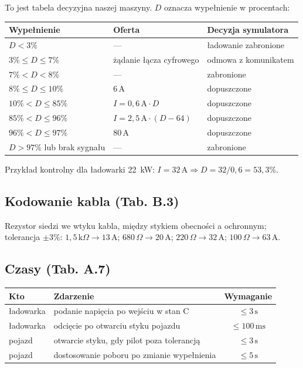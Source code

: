 \documentclass[a4paper,11pt]{article}
\newcommand{\ohm}{\,\Omega}
\newcommand{\kohm}{\,\mathrm{k}\Omega}
\newcommand{\amp}{\,\mathrm{A}}
\newcommand{\ms}{\,\mathrm{ms}}
\newcommand{\sek}{\,\mathrm{s}}
\begin{document}
To jest tabela decyzyjna naszej maszyny. $D$ oznacza wypełnienie w procentach:

\begin{center}
\begin{tabular}{lll}
\toprule
Wypełnienie & Oferta & Decyzja symulatora \\
\midrule
$D<3\%$              & ---                       & ładowanie zabronione \\
$3\% \le D \le 7\%$  & żądanie łącza cyfrowego   & odmowa z komunikatem \\
$7\% < D < 8\%$      & ---                       & zabronione \\
$8\% \le D \le 10\%$ & $6\amp$                   & dopuszczone \\
$10\% < D \le 85\%$  & $I = 0{,}6\amp \cdot D$   & dopuszczone \\
$85\% < D \le 96\%$  & $I = 2{,}5\amp \cdot (D-64)$ & dopuszczone \\
$96\% < D \le 97\%$  & $80\amp$                  & dopuszczone \\
$D>97\%$ lub brak sygnału & ---                  & zabronione \\
\bottomrule
\end{tabular}
\end{center}

Przykład kontrolny dla ładowarki 22~kW: $I=32\amp \Rightarrow D = 32/0{,}6 = 53{,}3\%$.

\subsection{Kodowanie kabla (Tab. B.3)}

Rezystor siedzi we wtyku kabla, między stykiem obecności a ochronnym; tolerancja
$\pm3\%$: $1{,}5\kohm \to 13\amp$; $680\ohm \to 20\amp$; $220\ohm \to 32\amp$;
$100\ohm \to 63\amp$.

\subsection{Czasy (Tab. A.7)}

\begin{center}
\begin{tabular}{llc}
\toprule
Kto & Zdarzenie & Wymaganie \\
\midrule
ładowarka & podanie napięcia po wejściu w stan C & $\le 3\sek$ \\
ładowarka & odcięcie po otwarciu styku pojazdu   & $\le 100\ms$ \\
pojazd    & otwarcie styku, gdy pilot poza tolerancją & $\le 3\sek$ \\
pojazd    & dostosowanie poboru po zmianie wypełnienia & $\le 5\sek$ \\
\bottomrule
\end{tabular}
\end{center}
\end{document}
